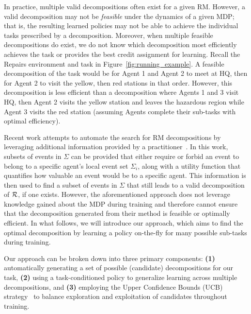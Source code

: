 In practice, multiple valid decompositions often exist for a given RM. However, a valid decomposition may not be \textit{feasible} under the dynamics of a given MDP; that is, the resulting learned policies may not be able to achieve the individual tasks prescribed by a decomposition. Moreover, when multiple feasible decompositions do exist, we do not know which decomposition most efficiently achieves the task or provides the best credit assignment for learning. Recall the Repairs environment and task in Figure~\ref{fig:running_example}. A feasible decomposition of the task would be for Agent 1 and Agent 2 to meet at HQ, then for Agent 2 to visit the yellow, then red stations in that order. However, this decomposition is less efficient than a decomposition where Agents 1 and 3 visit HQ, then Agent 2 visits the yellow station and leaves the hazardous region while Agent 3 visits the red station (assuming Agents complete their sub-tasks with optimal efficiency).

Recent work attempts to automate the search for RM decompositions by leveraging additional information provided by a practitioner~\cite{smith2023automatic}. In this work, subsets of events in $\Sigma$ can be provided that either require or forbid an event to belong to a specific agent's local event set $\Sigma_i$, along with a utility function that quantifies how valuable an event would be to a specific agent. This information is then used to find a subset of events in $\Sigma$ that still leads to a valid decomposition of $\mathcal{R}$, if one exists. However, the aforementioned approach does not leverage knowledge gained about the MDP during training and therefore cannot ensure that the decomposition generated from their method is feasible or optimally efficient. In what follows, we will introduce our approach, which aims to find the optimal decomposition by learning a policy on-the-fly for many possible sub-tasks during training.


Our approach can be broken down into three primary components: \textbf{(1)} automatically generating a set of possible (candidate) decompositions for our task, \textbf{(2)} using a task-conditioned policy to generalize learning across multiple decompositions, and \textbf{(3)} employing the Upper Confidence Bounds (UCB) strategy~\cite{auer02ucb} to balance exploration and exploitation of candidates throughout training. %



